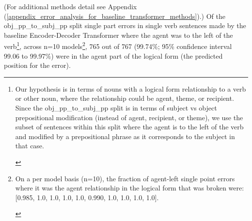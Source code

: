 \documentclass[11pt]{article}
\begin{document}

(For additional methods detail see Appendix (\ref{appendix_error_analysis_for_baseline_transformer_methods}).) Of the obj\_pp\_to\_subj\_pp split single part errors in single verb sentences made by the \cite{Wu2023} baseline Encoder-Decoder Transformer where the agent was to the left of the verb\footnote{\begin{footnotesize}Our hypothesis is in terms of nouns with a logical form relationship to a verb or other noun, where the relationship could be agent, theme, or recipient.
Since the obj\_pp\_to\_subj\_pp split is in terms of subject vs object prepositional modification (instead of agent, recipient, or theme), we use the subset of sentences within this split where the agent is to the left of the verb and modified by a prepositional phrase as it corresponds to the subject in that case.
\end{footnotesize}
}, 
across n=10 models\footnote{\begin{footnotesize}On a per model basis (n=10), the fraction of agent-left single point errors where it was the agent relationship in the logical form that was broken were: [0.985, 1.0, 1.0, 1.0, 1.0, 0.990, 1.0, 1.0, 1.0, 1.0].
\end{footnotesize}
}, 765 out of 767 (99.74\%; 95\% confidence interval 99.06 to 99.97\%) were in the agent part of the logical form (the predicted position for the error).
\end{document}
